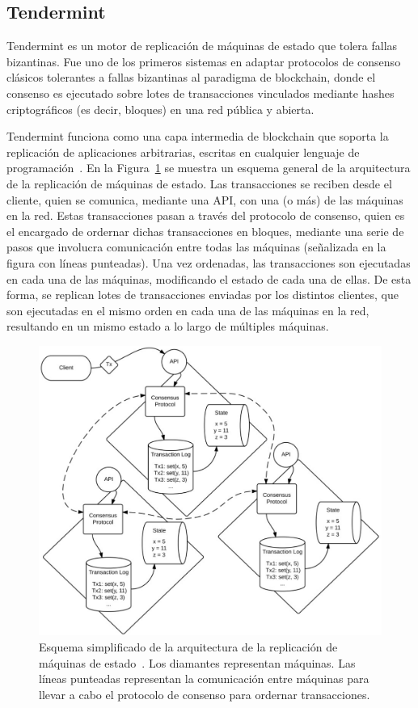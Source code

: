 \subsection{Tendermint}\label{sec:tendermint}
Tendermint es un motor de replicación de máquinas de estado que tolera fallas bizantinas.
%
Fue uno de los primeros sistemas en adaptar protocolos de consenso clásicos tolerantes a fallas bizantinas
al paradigma de blockchain, donde el consenso es ejecutado sobre lotes de transacciones vinculados mediante
hashes criptográficos (es decir, bloques) en una red pública y abierta.

%

Tendermint funciona como una capa intermedia de blockchain que soporta la replicación de aplicaciones arbitrarias,
escritas en cualquier lenguaje de programación~\cite{tendermint.design}.
%
En la Figura~\ref{fig:replication} se muestra un esquema general de la arquitectura de la replicación de máquinas de
estado.
%
Las transacciones se reciben desde el cliente, quien se comunica, mediante una API, con una (o más) de las máquinas
en la red.
%
Estas transacciones pasan a través del protocolo de consenso, quien es el encargado de ordernar dichas
transacciones en bloques, mediante una serie de pasos que involucra comunicación entre todas las máquinas
(señalizada en la figura con líneas punteadas).
%
Una vez ordenadas, las transacciones son ejecutadas en cada una de las máquinas, modificando el estado
de cada una de ellas.
%
De esta forma, se replican lotes de transacciones enviadas por los distintos clientes, que son ejecutadas en el mismo
orden en cada una de las máquinas en la red, resultando en un mismo estado a lo largo de múltiples máquinas.

\begin{figure}
  \centering
  \includegraphics[scale=0.25]{figures/replication_engine.pdf}
  \caption{Esquema simplificado de la arquitectura de la replicación de máquinas de estado~\cite{Buchman.2018.Tendermint}.
    Los diamantes representan máquinas.
    Las líneas punteadas representan la comunicación entre máquinas para llevar a cabo el protocolo de consenso para ordernar
    transacciones.
  }
  \label{fig:replication}
\end{figure}

